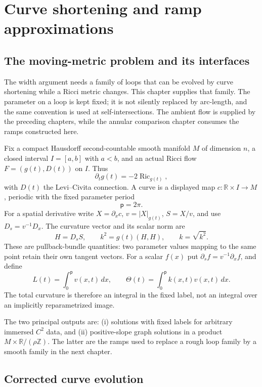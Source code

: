 \chapter{Curve shortening and ramp approximations}
\label{ch:ramps-v4}

\section{The moving-metric problem and its interfaces}
\label{sec:ramps-purpose}

The width argument needs a family of loops that can be evolved by curve
shortening while a Ricci metric changes.  This chapter supplies that family.
The parameter on a loop is kept fixed; it is not silently replaced by
arc-length, and the same convention is used at self-intersections.  The
ambient flow is supplied by the preceding chapters, while the annular
comparison chapter consumes the ramps constructed here.

Fix a compact Hausdorff second-countable smooth manifold $M$ of dimension
$n$, a closed interval $I=[a,b]$ with $a<b$, and an actual Ricci flow
$F=(g(t),D(t))$ on $I$.  Thus
\[
  \partial_tg(t)=-2\operatorname{Ric}_{g(t)},
\]
with $D(t)$ the Levi--Civita connection.  A curve is a displayed map
$c:\mathbb R\times I\to M$, periodic with the fixed parameter period
\[
  \mathsf p=2\pi.
\]
For a spatial derivative write $X=\partial_xc$, $v=|X|_{g(t)}$,
$S=X/v$, and use $D_s=v^{-1}D_x$.  The curvature vector and its scalar norm
are
\[
 H=D_sS,\qquad k^2=g(t)(H,H),\qquad k=\sqrt{k^2}.
\]
These are pullback-bundle quantities: two parameter values mapping to the
same point retain their own tangent vectors.  For a scalar $f(x)$ put
$\partial_sf=v^{-1}\partial_xf$, and define
\[
 L(t)=\int_0^{\mathsf p}v(x,t)\,dx,\qquad
 \Theta(t)=\int_0^{\mathsf p}k(x,t)v(x,t)\,dx.
\]
The total curvature is therefore an integral in the fixed label, not an
integral over an implicitly reparametrized image.

The two principal outputs are: (i) solutions with fixed labels for arbitrary
immersed $C^2$ data, and (ii) positive-slope graph solutions in a product
$M\times \mathbb R/(\rho\mathbb Z)$.  The latter are the ramps used to
replace a rough loop family by a smooth family in the next chapter.

\section{Corrected curve evolution}
\label{sec:ramps-corrected-evolution}

